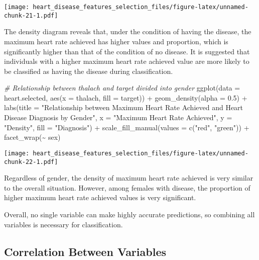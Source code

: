 \documentclass[
]{article}
\newenvironment{Shaded}{\begin{snugshade}}{\end{snugshade}}
\newcommand{\AttributeTok}[1]{\textcolor[rgb]{0.77,0.63,0.00}{#1}}
\newcommand{\CommentTok}[1]{\textcolor[rgb]{0.56,0.35,0.01}{\textit{#1}}}
\newcommand{\FloatTok}[1]{\textcolor[rgb]{0.00,0.00,0.81}{#1}}
\newcommand{\FunctionTok}[1]{\textcolor[rgb]{0.00,0.00,0.00}{#1}}
\newcommand{\NormalTok}[1]{#1}
\newcommand{\SpecialCharTok}[1]{\textcolor[rgb]{0.00,0.00,0.00}{#1}}
\newcommand{\StringTok}[1]{\textcolor[rgb]{0.31,0.60,0.02}{#1}}
\begin{document}
\texttt{[image: heart\_disease\_features\_selection\_files/figure-latex/unnamed-chunk-21-1.pdf]}

The density diagram reveals that, under the condition of having the
disease, the maximum heart rate achieved has higher values and
proportion, which is significantly higher than that of the condition of
no disease. It is suggested that individuals with a higher maximum heart
rate achieved value are more likely to be classified as having the
disease during classification.

\begin{Shaded}
\begin{Highlighting}[]
\CommentTok{\# Relationship between thalach and target divided into gender}
\FunctionTok{ggplot}\NormalTok{(}\AttributeTok{data =}\NormalTok{ heart.selected, }\FunctionTok{aes}\NormalTok{(}\AttributeTok{x =}\NormalTok{ thalach, }\AttributeTok{fill =}\NormalTok{ target)) }\SpecialCharTok{+}
  \FunctionTok{geom\_density}\NormalTok{(}\AttributeTok{alpha =} \FloatTok{0.5}\NormalTok{) }\SpecialCharTok{+}
  \FunctionTok{labs}\NormalTok{(}\AttributeTok{title =} \StringTok{"Relationship between Maximum Heart Rate Achieved and Heart Disease Diagnosis by Gender"}\NormalTok{,}
       \AttributeTok{x =} \StringTok{"Maximum Heart Rate Achieved"}\NormalTok{, }\AttributeTok{y =} \StringTok{"Density"}\NormalTok{, }\AttributeTok{fill =} \StringTok{"Diagnosis"}\NormalTok{) }\SpecialCharTok{+}
  \FunctionTok{scale\_fill\_manual}\NormalTok{(}\AttributeTok{values =} \FunctionTok{c}\NormalTok{(}\StringTok{"red"}\NormalTok{, }\StringTok{"green"}\NormalTok{)) }\SpecialCharTok{+}
  \FunctionTok{facet\_wrap}\NormalTok{(}\SpecialCharTok{\textasciitilde{}}\NormalTok{ sex)}
\end{Highlighting}
\end{Shaded}

\texttt{[image: heart\_disease\_features\_selection\_files/figure-latex/unnamed-chunk-22-1.pdf]}

Regardless of gender, the density of maximum heart rate achieved is very
similar to the overall situation. However, among females with disease,
the proportion of higher maximum heart rate achieved values is very
significant.

Overall, no single variable can make highly accurate predictions, so
combining all variables is necessary for classification.

\hypertarget{correlation-between-variables}{%
\subsection{Correlation Between
Variables}\label{correlation-between-variables}}
\end{document}
